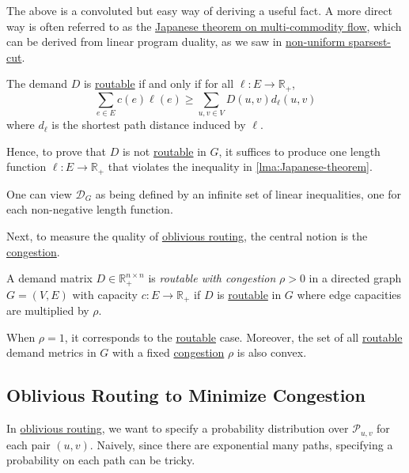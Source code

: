 The above is a convoluted but easy way of deriving a useful fact. A more direct way is often referred to as the \hyperref[lma:Japanese-theorem]{Japanese theorem on multi-commodity flow}, which can be derived from linear program duality, as we saw in \hyperref[prb:non-uniform-sparsest-cut]{non-uniform sparsest-cut}.

\begin{lemma}\label{lma:Japanese-theorem}
	The demand \(D\) is \hyperref[def:routable]{routable} if and only if for all \(\ell \colon E \to \mathbb{R} _{+}\),
	\[
		\sum_{e \in E} c(e) \ell (e) \geq \sum_{u, v \in V} D(u, v) d_{\ell } (u, v)
	\]
	where \(d_{\ell } \) is the shortest path distance induced by \(\ell \).
\end{lemma}

Hence, to prove that \(D\) is not \hyperref[def:routable]{routable} in \(G\), it suffices to produce one length function \(\ell \colon E \to \mathbb{R} _{+}\) that violates the inequality in \autoref{lma:Japanese-theorem}.

\begin{intuition}
	One can view \(\mathcal{D} _G\) as being defined by an infinite set of linear inequalities, one for each non-negative length function.
\end{intuition}

Next, to measure the quality of \hyperref[prb:oblivious-routing]{oblivious routing}, the central notion is the \hyperref[def:congestion]{congestion}.

\begin{definition}[Congestion]\label{def:congestion}
	A demand matrix \(D \in \mathbb{R} _{+}^{n \times n}\) is \emph{routable with congestion} \(\rho > 0\) in a directed graph \(G = (V, E)\) with capacity \(c \colon E \to \mathbb{R} _{+}\) if \(D\) is \hyperref[def:routable]{routable} in \(G\) where edge capacities are multiplied by \(\rho \).
\end{definition}

When \(\rho = 1\), it corresponds to the \hyperref[def:routable]{routable} case. Moreover, the set of all \hyperref[def:routable]{routable} demand metrics in \(G\) with a fixed \hyperref[def:congestion]{congestion} \(\rho \) is also convex.

\subsection{Oblivious Routing to Minimize Congestion}
In \hyperref[prb:oblivious-routing]{oblivious routing}, we want to specify a probability distribution over \(\mathcal{P} _{u, v}\) for each pair \((u, v)\). Naively, since there are exponential many paths, specifying a probability on each path can be tricky.

